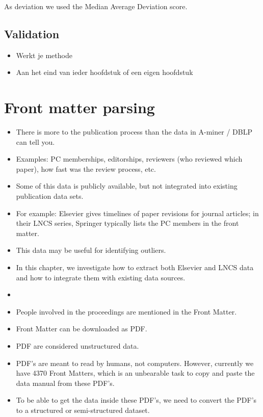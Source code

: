 \documentclass{ou-report}
\newcommand{\outline}[1]{{\color{blue} #1}}
\begin{document}
As deviation we used the Median Average Deviation score.

\section{Validation}
\outline{
\begin{itemize}
    \item Werkt je methode
    \item Aan het eind van ieder hoofdstuk of een eigen hoofdstuk
\end{itemize}
}


\chapter{Front matter parsing}
\label{chp:front_matter_parsing}
\begin{itemize}
    \item There is more to the publication process than the data
        in A-miner / DBLP can tell you.
    \item Examples: PC memberships, editorships, reviewers (who reviewed which paper),
        how fast was the review process, etc.
    \item Some of this data is publicly available, but not integrated into existing
        publication data sets.
    \item For example: Elsevier gives timelines of paper revisions for journal articles;
        in their LNCS series, Springer typically lists the PC members in the front matter.
    \item This data may be useful for identifying outliers.
    \item In this chapter, we investigate how to extract both Elsevier and LNCS data and
        how to integrate them with existing data sources.
    \item
    \item People involved in the proceedings are mentioned in the Front Matter.
    \item Front Matter can be downloaded as PDF.
    \item PDF are considered unstructured data.
    \item PDF's are meant to read by humans, not computers. However, currently 
        we have 4370 Front Matters, which is an unbearable task to copy and 
        paste the data manual from these PDF's.
    \item To be able to get the data inside these PDF's, we need to convert the 
        PDF's to a structured or semi-structured dataset.
\end{itemize}
\end{document}
